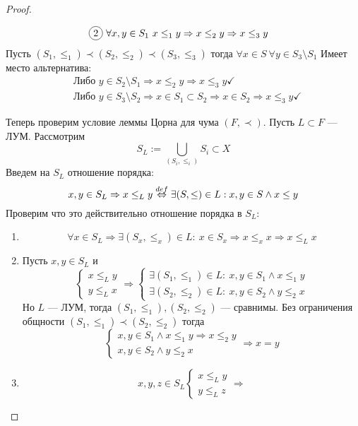 \begin{proof}
\begin{enumerate}
\begin{align*}
		& \circled{2} \ \forall x,y \in S_1 \ x \leq_1 y \Rightarrow x \leq_2 y \Rightarrow x \leq_3 y
	\end{align*}
	Пусть $(S_1, \leq_1) \prec (S_2, \leq_2) \prec (S_3, \leq_3)$ тогда $\forall x \in S \ \forall y \in S_3 \setminus S_1$ Имеет место альтернатива:
	\begin{align*}
		&\text{Либо } y \in S_2 \setminus S_1 \Rightarrow x \leq_2 y \Rightarrow x \leq_3 y \checkmark \\
		&\text{Либо } y \in S_3 \setminus S_2 \Rightarrow x \in S_1 \subset S_2 \Rightarrow x \in S_2 \Rightarrow x \leq_3 y \checkmark
	\end{align*}
\end{enumerate}
	Теперь проверим условие леммы Цорна для чума $(F, \prec)$. Пусть $L \subset F$ --- ЛУМ. Рассмотрим
	$$
	S_L := \bigcup\limits_{(S_i, \leq_i)} S_i \subset X
	$$
	Введем на $S_L$ отношение порядка:
	$$
	x, y \in S_L \Rightarrow x \leq_L y  \stackrel{def}\Leftrightarrow \exists (S, \leq) \in L: x,y \in S \wedge x \leq y
	$$
	Проверим что это действительно отношение порядка в $S_L$: 
	\begin{enumerate}
		\item 
		$$
		\forall x \in S_L \Rightarrow \exists (S_x, \leq_x) \in L: \ x \in S_x \Rightarrow x \leq_x x \Rightarrow x \leq_L x
		$$
		\item Пусть $x,y \in S_L$ и 
		$$
		\begin{cases}
			x \leq_L y \\
			y \leq_L x
		\end{cases} \Rightarrow
		\begin{cases}
			\exists (S_1, \leq_1) \in L : \ x,y \in S_1 \wedge x \leq_1 y \\
			\exists (S_2, \leq_2) \in L: \ x,y \in S_2 \wedge y \leq_2 x
		\end{cases}
		$$
		Но $L$ --- ЛУМ, тогда $(S_1, \leq_1), (S_2, \leq_2)$ --- сравнимы. Без ограничения общности \newline $(S_1, \leq_1) \prec (S_2, \leq_2)$ тогда
		$$
		\begin{cases}
			x,y \in S_1 \wedge x \leq_1 y \Rightarrow x \leq_2 y \\
			x,y \in S_2 \wedge y \leq_2 x \
		\end{cases} \Rightarrow x = y
		$$ 
		\item 
		$$
		x,y,z \in S_L
		\begin{cases}
			x \leq_L y \\
			y \leq_L z 
		\end{cases}
		\Rightarrow 
$$
\end{enumerate}
\end{proof}
